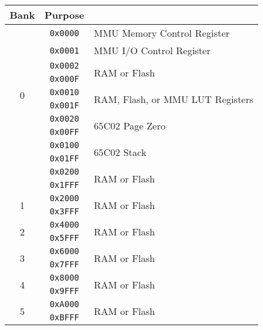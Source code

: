 \begin{table}
    \begin{center}
        \begin{tabular}{|c|c|l|} \hline
            Bank & Purpose \\ \hline\hline
            \multirow{10}{*}{0} & \verb+0x0000+ & MMU Memory Control Register \\ \cline{2-3}
            & \verb+0x0001+ & MMU I/O Control Register \\ \cline{2-3}
            & \verb+0x0002+ & \multirow{2}{*}{RAM or Flash} \\ \cline{2-2}
            & \verb+0x000F+ & \\ \cline{2-3}
            & \verb+0x0010+ & \multirow{2}{*}{RAM, Flash, or MMU LUT Registers} \\ \cline{2-2}
            & \verb+0x001F+ & \\ \cline{2-3}
            & \verb+0x0020+ & \multirow{2}{*}{65C02 Page Zero} \\ \cline{2-2}
            & \verb+0x00FF+ & \\ \cline{2-3}
            & \verb+0x0100+ & \multirow{2}{*}{65C02 Stack} \\ \cline{2-2}
            & \verb+0x01FF+ & \\ \cline{2-3}
            & \verb+0x0200+ & \multirow{2}{*}{RAM or Flash} \\ \cline{2-2}
            & \verb+0x1FFF+ & \\ \hline
            \multirow{2}{*}{1} & \verb+0x2000+ & \multirow{2}{*}{RAM or Flash} \\ \cline{2-2}
            & \verb+0x3FFF+ & \\ \hline
            \multirow{2}{*}{2} & \verb+0x4000+ & \multirow{2}{*}{RAM or Flash} \\ \cline{2-2}
            & \verb+0x5FFF+ & \\ \hline
            \multirow{2}{*}{3} & \verb+0x6000+ & \multirow{2}{*}{RAM or Flash} \\ \cline{2-2}
            & \verb+0x7FFF+ & \\ \hline
            \multirow{2}{*}{4} & \verb+0x8000+ & \multirow{2}{*}{RAM or Flash} \\ \cline{2-2}
            & \verb+0x9FFF+ & \\ \hline
            \multirow{2}{*}{5} & \verb+0xA000+ & \multirow{2}{*}{RAM or Flash} \\ \cline{2-2}
            & \verb+0xBFFF+ & \\ \hline

\end{tabular}
\end{center}
\end{table}
